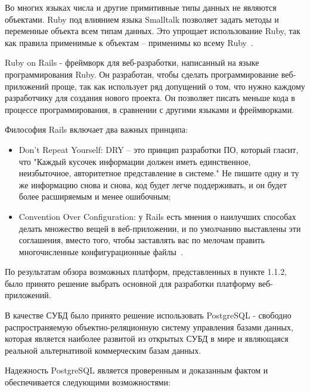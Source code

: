 Во многих языках числа и другие примитивные типы данных не являются объектами. Ruby под влиянием языка Smalltalk
позволяет задать методы и переменные объекта всем типам данных. Это упрощает использование Ruby, так как правила
применимые к объектам -- применимы ко всему Ruby~\cite{ruby}.

Ruby on Rails - фреймворк для веб-разработки, написанный на языке программирования Ruby. Он разработан, чтобы сделать
программирование веб-приложений проще, так как использует ряд допущений о том, что нужно каждому разработчику для
создания нового проекта. Он позволяет писать меньше кода в процессе программирования, в сравнении с другими языками и
фреймворками.

Философия Rails включает два важных принципа:

\begin{itemize}
	\item Don't Repeat Yourself: DRY -- это принцип разработки ПО, который гласит, что "Каждый кусочек информации должен
	иметь единственное, неизбыточное, авторитетное представление в системе." Не пишите одну и ту же информацию снова и
	снова, код будет легче поддерживать, и он будет более расширяемым и менее ошибочным;
	\item Convention Over Configuration: у Rails есть мнения о наилучших способах делать множество вещей в веб-приложении,
	и по умолчанию выставлены эти соглашения, вместо того, чтобы заставлять вас по мелочам править многочисленные
	конфигурационные файлы~\cite{rails}.
\end{itemize}

По результатам обзора возможных платформ, представленных в пункте 1.1.2, было принято решение выбрать основной для
разработки платформу веб-приложений.

В качестве СУБД было принято решение использовать PostgreSQL - свободно распространяемую объектно-реляционную систему
управления базами данных, которая является наиболее развитой из открытых СУБД в мире и являющаяся реальной
альтернативой коммерческим базам данных.

Надежность PostgreSQL является проверенным и доказанным фактом и обеспечивается следующими возможностями:

